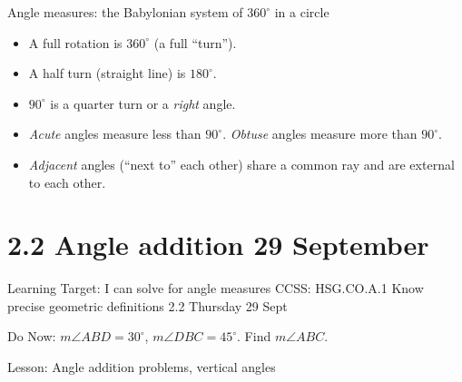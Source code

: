 \begin{frame}{Angle measures: the Babylonian system of $360^\circ$ in a circle}
    \begin{itemize}
      \item A full rotation is $360^\circ$ (a full ``turn'').
      \item A half turn (straight line) is $180^\circ$.
      \item $90^\circ$ is a quarter turn or a \emph{right} angle.
      \item \emph{Acute} angles measure less than $90^\circ$. \emph{Obtuse} angles measure more than $90^\circ$.
      \item \emph{Adjacent} angles (``next to'' each other) share a common ray and are external to each other.
    \end{itemize}
  \begin{center}
    \end{center}
\end{frame}

\section{2.2 Angle addition \hfill 29 September}
\begin{frame}{Learning Target: I can solve for angle measures}
  {CCSS: HSG.CO.A.1 Know precise geometric definitions \hfill \alert{2.2 Thursday 29 Sept}}

  \begin{block}{Do Now: $m\angle ABD=30^\circ$, $m\angle DBC=45^\circ$. Find $m\angle ABC$.}\vspace{0.5cm}
          \begin{center}
            \end{center}
  \end{block}
  Lesson: Angle addition problems, vertical angles
\end{frame}

